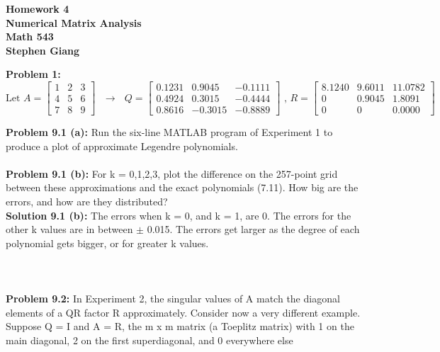 \documentclass[12pt]{article}
\begin{document}
	
	\begin{center}
		\textbf{Homework 4} \\
		\textbf{Numerical Matrix Analysis} \\
		\textbf{Math 543} \\
		\textbf{Stephen Giang} \\
	\end{center}

\noindent \textbf{Problem 1: } \\
	$$\text{Let } 
	A = 
	\begin{bmatrix}
		1 & 2 & 3 \\
		4 & 5 & 6 \\
		7 & 8 & 9
	\end{bmatrix} 
	\text{ $\rightarrow$ } 
	Q = 
	\begin{bmatrix}
		0.1231  &  0.9045  & -0.1111 \\
		0.4924  &  0.3015  & -0.4444 \\
		0.8616  & -0.3015  & -0.8889
	\end{bmatrix}
	\text{ , }
	R = 
	\begin{bmatrix}
		8.1240  &  9.6011  & 11.0782 \\
		0  &  0.9045  &  1.8091 \\
		0    &     0  &  0.0000
	\end{bmatrix}$$
	
\vspace{\baselineskip}
\vspace{\baselineskip}
\vspace{\baselineskip}

\noindent \textbf{Problem 9.1 (a): }
Run the six-line MATLAB program of Experiment 1 to produce a
plot of approximate Legendre polynomials.  
\\ \\
\noindent \textbf{Problem 9.1 (b): } For k = 0,1,2,3, plot the difference on the 257-point grid between these
approximations and the exact polynomials (7.11). How big are the errors, and how are they distributed? \\

\noindent \textbf{Solution 9.1 (b): } The errors when k = 0, and k = 1, are 0.  The errors for the other k values are in between $\pm$ 0.015. The errors get larger as the degree of each polynomial gets bigger, or for greater k values. \\ \\
\\ \\
\noindent \textbf{Problem 9.2: } In Experiment 2, the singular values of A match the diagonal elements of a QR factor R approximately. Consider now a very different example. Suppose Q = I and A = R, the m x m matrix (a Toeplitz matrix) with 1 on the main diagonal, 2 on the first superdiagonal, and 0 everywhere else \\
\end{document}
